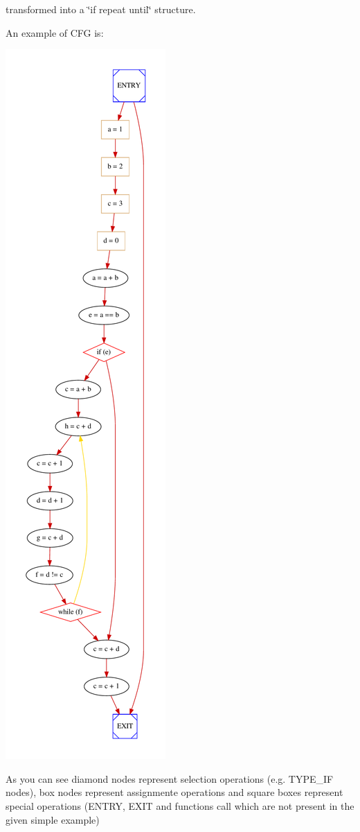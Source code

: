 transformed into a \char`\"{}if repeat until\char`\"{} structure.

An example of C\+FG is\+: 
\begin{DoxyImageNoCaption}
  \mbox{\includegraphics[width=\textwidth,height=\textheight/2,keepaspectratio=true]{dot_inline_dotgraph_1}}
\end{DoxyImageNoCaption}
 As you can see diamond nodes represent selection operations (e.\+g. T\+Y\+P\+E\+\_\+\+IF nodes), box nodes represent assignmente operations and square boxes represent special operations (E\+N\+T\+RY, E\+X\+IT and functions call which are not present in the given simple example)

